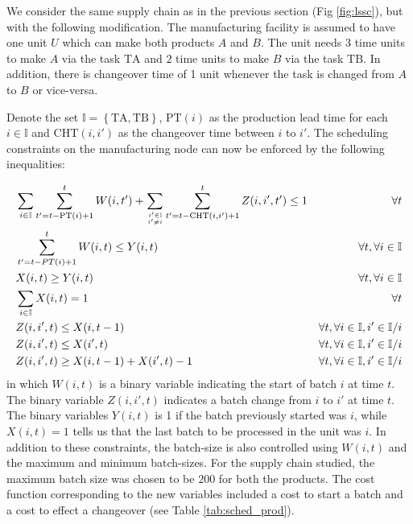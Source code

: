 \documentclass[10pt]{article}
\newcommand{\set}[1]{\left\lbrace #1 \right\rbrace}
\theoremstyle{definition}
\begin{document}
We consider the same supply chain as in the previous section (Fig
\ref{fig:lssc}), but with the following modification. The
manufacturing facility is assumed to have one unit $U$ which can
 make both products $A$ and $B$. The unit needs $3$ time units to make
$A$ via the task $\text{TA}$ and $2$ time units to make $B$ via the task
$\text{TB}$. In addition, there is changeover time of 1 unit whenever the
task is changed from $A$ to $B$ or vice-versa. 

Denote the set $\mathbb{I} = \set{\text{TA},\text{TB}}$,  $\text{PT}(i)$ as the
production lead time for each $i \in \mathbb{I}$ and $\text{CHT}(i,i')$ as
the changeover time between $i$ to $i'$. The scheduling constraints on
the manufacturing node can now be enforced by the following
inequalities:


\begin{alignat}{2}
&\sum_{i\in \mathbb{I}}\sum_{t' = t-\text{PT}(i)+1}^{t}W(i,t')+\sum_{i' \in
 \mathbb{I} \atop i' \neq i}\sum_{t'=t-\text{CHT}(i,i')+1}^{t} Z(i,i',t') \leq 1 & \forall t \nonumber \\
&\sum_{t' = t-PT(i)+1}^{t} W(i,t) \leq Y(i,t) & \forall t, \forall i
\in \mathbb{I} \nonumber\\
&X(i,t) \geq Y(i,t) & \forall t, \forall i \in \mathbb{I} \nonumber\\
&\sum_{i \in \mathbb{I}}X(i,t) = 1 & \forall t  \label{eq:assign}\\
&Z(i,i',t) \leq X(i,t-1) &\forall t, \forall i \in \mathbb{I}, i' \in
\mathbb{I}/i \nonumber\\
&Z(i,i',t) \leq X(i',t) &\forall t, \forall i \in \mathbb{I}, i' \in
\mathbb{I}/i \nonumber \\
&Z(i,i',t) \geq X(i,t-1)+X(i',t)-1 &\forall t, \forall i \in \mathbb{I}, i' \in
\mathbb{I}/i \nonumber
\end{alignat}
in which $W(i,t)$ is a binary variable indicating the start of batch
$i$ at time $t$. The binary variable $Z(i,i',t)$ indicates a batch
change from $i$ to $i'$ at time $t$. The binary variables $Y(i,t)$
is 1 if the batch previously started was $i$, while $X(i,t) = 1$ tells
us that the last batch to be processed in the unit was $i$. In
addition to these constraints, the batch-size is also controlled using
$W(i,t)$ and the maximum and minimum batch-sizes. For the supply chain
studied, the maximum batch size was chosen to be $200$ for both the
products. The cost function corresponding to the new variables
included a cost to start a batch and a cost to effect a changeover
(see Table \ref{tab:sched_prod}).
\end{document}
